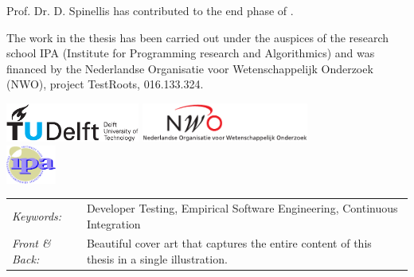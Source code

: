 \begin{titlepage}
\begin{tabular}{p{3.6cm}l}
    
\end{tabular}

\medskip
\noindent Prof. Dr. D. Spinellis has contributed to the end phase of .  %

\medskip
\noindent The work in the thesis has been carried out under the auspices of the research school IPA
(Institute for Programming research and Algorithmics) and was financed by the Nederlandse
Organisatie voor Wetenschappelijk Onderzoek (NWO), project TestRoots, 016.133.324.

\medskip
\vfill
\begin{center}
    \includegraphics[height=0.5in]{title/logos/tudelft}
    \hspace{2em}
    \includegraphics[height=0.5in]{title/logos/nwo}
    \\ \vspace{0.5cm}
    \includegraphics[height=0.5in]{title/logos/ipa}
\end{center}
\vfill

\noindent
\begin{tabular}{@{}p{}@{}p{}}
    \textit{Keywords:} & Developer Testing, Empirical Software Engineering, Continuous Integration \\[\medskipamount]
    \textit{Front \& Back:} & Beautiful cover art that captures the entire content of this thesis in a single illustration.
\end{tabular}


\end{titlepage}
